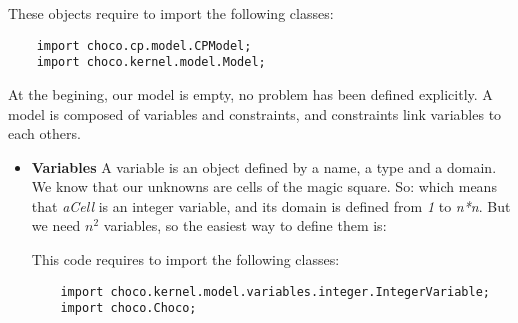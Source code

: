 These objects require to import the following classes:
\begin{lstlisting}
	import choco.cp.model.CPModel;
	import choco.kernel.model.Model;
\end{lstlisting}

At the begining, our model is empty, no problem has been defined explicitly. A model is composed of variables and constraints, and constraints link variables to each others.

\begin{itemize}
\item 
\textbf{Variables}\label{gettingstarted:variables}\hypertarget{gettingstarted:variables}{}
A variable is an object defined by a name, a type and a domain. We know that our unknowns are cells of the magic square. So:
which means that \emph{aCell} is an integer variable, and its domain is defined from \emph{1} to \emph{n*n}.
But we need $n^2$ variables, so the easiest way to define them is:


This code requires to import the following classes:
\begin{lstlisting}
	import choco.kernel.model.variables.integer.IntegerVariable;
	import choco.Choco;
\end{lstlisting}


\end{itemize}

